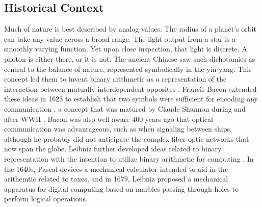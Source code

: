 \documentclass[twocolumn]{article}
\begin{document}
\subsection{\label{sec:history}Historical Context}
Much of nature is best described by analog values. The radius of a planet's orbit can take any value across a broad range. The light output from a star is a smoothly varying function. Yet upon close inspection, that light is discrete. A photon is either there, or it is not. The ancient Chinese saw such dichotomies as central to the balance of nature, represented symbolically in the yin-yang. This concept led them to invent binary arithmetic as a representation of the interaction between mutually interdependent opposites \cite{http://www.atimes.com/leibniz-chinese-invented-first-binary-code/}. Francis Bacon extended these ideas in 1623 to establish that two symbols were sufficient for encoding any communication \cite{dy2012}, a concept that was matured by Claude Shannon during and after WWII \cite{sh1948}. Bacon was also well aware 400 years ago that optical communication was advantageous, such as when signaling between ships, although he probably did not anticipate the complex fiber-optic networks that now span the globe. Leibniz further developed ideas related to binary representation \cite{http://www.leibniz-translations.com/binary.htm} with the intention to utilize binary arithmetic for computing \cite{https://hal.archives-ouvertes.fr/ads-00104781/document,dy2012}. In the 1640s, Pascal devices a mechanical calculator intended to aid in the arithemtic related to taxes, and in 1679, Leibniz proposed a mechanical apparatus for digital computing based on marbles passing through holes to perform logical operations.
\end{document}

